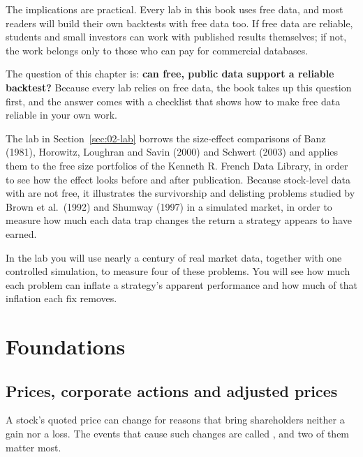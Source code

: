The implications are practical. Every lab in this book uses free data, and most readers will build their own backtests with free data too. If free data are reliable, students and small investors can work with published results themselves; if not, the work belongs only to those who can pay for commercial databases. 

The question of this chapter is: \textbf{can free, public data support a reliable backtest?} Because every lab relies on free data, the book takes up this question first, and the answer comes with a checklist that shows how to make free data reliable in your own work.

The lab in Section~\ref{sec:02-lab} borrows the size-effect comparisons of Banz (1981), Horowitz, Loughran and Savin (2000) and Schwert (2003) and applies them to the free size portfolios of the Kenneth R. French Data Library, in order to see how the effect looks before and after publication. Because stock-level data with  are not free, it illustrates the survivorship and delisting problems studied by Brown et al.\ (1992) and Shumway (1997) in a simulated market, in order to measure how much each data trap changes the return a strategy appears to have earned.


In the lab you will use nearly a century of real market data, together with one controlled simulation, to measure four of these problems. You will see how much each problem can inflate a strategy's apparent performance and how much of that inflation each fix removes.


\section{Foundations}
\label{sec:02-foundations}

\subsection{Prices, corporate actions and adjusted prices}

A stock's quoted price can change for reasons that bring shareholders neither a gain nor a loss. The events that cause such changes are called , and two of them matter most.

